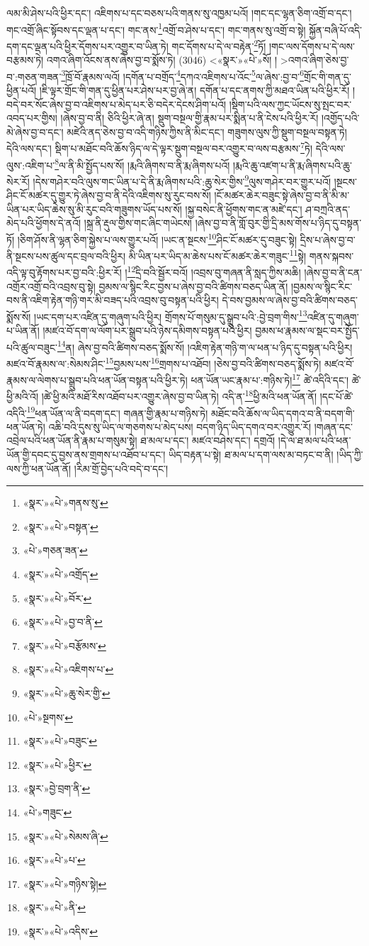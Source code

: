 ལམ་མི་ཤེས་པའི་ཕྱིར་དང་། འཇིགས་པ་དང་བཅས་པའི་གནས་སུ་འཁྱམ་པའོ། །གང་དང་ལྷན་ཅིག་འགྲོ་བ་དང་། གང་འགྲོ་ཞིང་སྟོབས་དང་ལྡན་པ་དང་། གང་ནས་\footnote{«སྣར་»«པེ་»གནས་སུ་}འགྲོ་བ་ཤེས་པ་དང་། གང་གནས་སུ་འགྲོ་བ་སྟེ། སྐྱོན་བཞི་པོ་འདི་དག་དང་ལྡན་པའི་ཕྱིར་དོགས་པར་འགྱུར་བ་ཡིན་ཏེ། གང་དོགས་པ་དེ་ལ་བརྟེན་\footnote{«སྣར་»«པེ་»བསྟན་}ཏོ། །གང་ལས་དོགས་པ་དེ་ལས་བརྩམས་ཏེ། འགའ་ཞིག་འོངས་ནས་ཞེས་བྱ་བ་སྨོས་ཏེ། (3046) <«སྣར་»«པེ་»སོ། །
 >འགའ་ཞིག་ཅེས་བྱ་བ་:གཅན་གཟན་\footnote{«པེ་»གཅན་ཟན་}ཁྲོ་བོ་རྣམས་ལའོ། །དགོན་པ་བགྲོད་\footnote{«སྣར་»«པེ་»འགྲོད་}དཀའ་འཇིགས་པ་འོང་\footnote{«སྣར་»«པེ་»བོར་}ལ་ཞེས་:བྱ་བ་\footnote{«སྣར་»«པེ་»བྱ་བ་ནི་}གྲོང་གི་གན་དུ་ཕྱིན་པའོ། །ཇི་ལྟར་གྲོང་གི་གན་དུ་ཕྱིན་པར་ཤེས་པར་བྱ་ཞེ་ན། དགོན་པ་དང་ནགས་ཀྱི་མཐའ་ཡིན་པའི་ཕྱིར་རོ། །བདེ་བར་སོང་ཞེས་བྱ་བ་འཇིགས་པ་མེད་པར་ཅི་བདེར་དེངས་ཤིག་པའོ། །སྡིག་པའི་ལས་ཀྱང་ཡོངས་སུ་སྤང་བར་འབད་པར་གྱིས། །ཞེས་བྱ་བ་ནི། ཅིའི་ཕྱིར་ཞེ་ན། སྡུག་བསྔལ་གྱི་རྣམ་པར་སྨིན་པ་ནི་ངེས་པའི་ཕྱིར་རོ། །འགྱོད་པའི་མེ་ཞེས་བྱ་བ་དང་། མཛེའི་ནད་ཅེས་བྱ་བ་འདི་གཉིས་ཀྱིས་ནི་མིང་དང་། གཟུགས་ལུས་ཀྱི་སྡུག་བསྔལ་བསྟན་ཏེ། དེའི་ལས་དང་། སྡིག་པ་མཐོང་བའི་ཆོས་ཉིད་ལ་དེ་ལྟར་སྡུག་བསྔལ་བར་འགྱུར་བ་ལས་བརྩམས་\footnote{«སྣར་»«པེ་»བརྩོམས་}ཏེ། དེའི་ལས་ལུས་:འཇིག་པ་\footnote{«སྣར་»«པེ་»འཇིགས་པ་}ལ་ནི་མི་སྤྱོད་པས་སོ། །རྨའི་ཞིགས་བ་ནི་རྨ་ཞིགས་པའོ། །རྨའི་ཆུ་འཛག་པ་ནི་རྨ་ཞིགས་པའི་ཆུ་སེར་རོ། །དེས་གཤེར་བའི་ལུས་གང་ཡིན་པ་དེ་ནི་རྨ་ཞིགས་པའི་:ཆུ་སེར་གྱིས་\footnote{«སྣར་»«པེ་»ཆུ་སེར་གྱི་}ལུས་གཤེར་བར་གྱུར་པའོ། །སྔངས་ཤིང་ངོ་མཚར་དུ་གྱུར་ཏེ་ཞེས་བྱ་བ་ནི་དེའི་འཇིགས་སུ་རུང་བས་སོ། །ངོ་མཚར་ཆེར་བཟུང་སྟེ་ཞེས་བྱ་བ་ནི་མི་མ་ཡིན་པར་ཡིད་ཆེས་སུ་མི་རུང་བའི་གཟུགས་ཡོད་པས་སོ། །སྐྱ་བསེང་ནི་ཕྱོགས་གང་ན་མཛེ་དང་། ཤ་བཀྲའི་ནད་མེད་པའི་ཕྱོགས་དེ་ནའོ། །སྐྲ་ནི་རྡུལ་གྱིས་གང་ཞིང་གཡེངས། །ཞེས་བྱ་བ་ནི་གློ་བུར་གྱི་དྲི་མས་གོས་པ་ཉིད་དུ་བསྟན་ཏོ། །ཅིག་ཤོས་ནི་ལྷན་ཅིག་སྐྱེས་པ་ལས་གྱུར་པའོ། །ཡང་ན་སྔངས་\footnote{«པེ་»སྔགས་}ཤིང་ངོ་མཚར་དུ་བཟུང་སྟེ། དྲིས་པ་ཞེས་བྱ་བ་ནི་སྔངས་པས་ཚུལ་དང་བྲལ་བའི་ཕྱིར། མི་ཡིན་པར་ཡིད་མ་ཆེས་པས་ངོ་མཚར་ཆེར་གཟུང་\footnote{«སྣར་»«པེ་»བཟུང་}སྟེ། གནས་སྐབས་འདི་ལྟ་བུ་རྟོགས་པར་བྱ་བའི་:ཕྱིར་རོ། །\footnote{«སྣར་»«པེ་»ཕྱིར་}དྲི་བའི་སྦྱོར་བའོ། །འབྲས་བུ་གཞན་ནི་སླད་ཀྱིས་མཆི། །ཞེས་བྱ་བ་ནི་ངན་འགྲོར་འགྲོ་བའི་འབྲས་བུ་སྟེ། བྱམས་ལ་སྙིང་རིང་བྱས་པ་ཞེས་བྱ་བའི་ཚིགས་བཅད་ཡིན་ནོ། །བྱམས་ལ་སྙིང་རིང་བས་ནི་འཇིག་རྟེན་གཉི་གར་མི་བཟད་པའི་འབྲས་བུ་བསྟན་པའི་ཕྱིར། དེ་བས་བྱམས་ལ་ཞེས་བྱ་བའི་ཚིགས་བཅད་སྨོས་སོ། །ཡང་དག་པར་འཛིན་དུ་གཞུག་པའི་ཕྱིར། གྲོགས་པོ་གསུམ་དུ་སྒྲུབ་པའི་:བྱེ་བྲག་གིས་\footnote{«སྣར་»བྱེ་བྲག་ནི་}འཛིན་དུ་གཞུག་པ་ཡིན་ནོ། །མཛའ་བོ་དག་ལ་ལོག་པར་སྒྲུབ་པའི་ཉེས་དམིགས་བསྟན་པའི་ཕྱིར། བྱམས་ཕ་རྣམས་ལ་སྡང་བར་སྤྱོད་པའི་ཚུལ་བཟུང་\footnote{«པེ་»གཟུང་}ན། ཞེས་བྱ་བའི་ཚིགས་བཅད་སྨོས་སོ། །འཇིག་རྟེན་གཉི་ག་ལ་ཕན་པ་ཉིད་དུ་བསྟན་པའི་ཕྱིར། མཛའ་བོ་རྣམས་ལ་:སེམས་ཤིང་\footnote{«སྣར་»«པེ་»སེམས་ཞི་}བྱམས་པས་\footnote{«སྣར་»«པེ་»པ་}གྲགས་པ་འཐོབ། །ཅེས་བྱ་བའི་ཚིགས་བཅད་སྨོས་ཏེ། མཛའ་བོ་རྣམས་ལ་ལེགས་པ་སྒྲུབ་པའི་ཕན་ཡོན་བསྟན་པའི་ཕྱིར་ཏེ། ཕན་ཡོན་ཡང་རྣམ་པ་:གཉིས་ཏེ།\footnote{«སྣར་»«པེ་»གཉིས་སྟེ།} ཚེ་འདིའི་དང་། ཚེ་ཕྱི་མའི་འོ། །ཚེ་ཕྱི་མའི་མཐོ་རིས་འཐོབ་པར་འགྱུར་ཞེས་བྱ་བ་ཡིན་ཏེ། འདི་ན་\footnote{«སྣར་»«པེ་»ནི་}ཕྱི་མའི་ཕན་ཡོན་ནོ། །དང་པོ་ཚེ་འདིའི་\footnote{«སྣར་»«པེ་»འདིས་}ཕན་ཡོན་ལ་ནི་བདག་དང་། གཞན་གྱི་རྣམ་པ་གཉིས་ཏེ། མཐོང་བའི་ཆོས་ལ་ཡིད་དགའ་བ་ནི་བདག་གི་ཕན་ཡོན་ཏེ། འཆི་བའི་དུས་སུ་ཡིད་ལ་གཅགས་པ་མེད་པས། བདག་ཉིད་ཡིད་དགའ་བར་འགྱུར་རོ། །གཞན་དང་འབྲེལ་པའི་ཕན་ཡོན་ནི་རྣམ་པ་གསུམ་སྟེ། ཐ་མལ་པ་དང་། མཛའ་བཤེས་དང་། དགྲའོ། །དེ་ལ་ཐ་མལ་པའི་ཕན་ཡོན་གྱི་དབང་དུ་བྱས་ནས་གྲགས་པ་འཐོབ་པ་དང་། ཡིད་བརྟན་པ་སྟེ། ཐ་མལ་པ་དག་ལས་མ་བཏང་བ་ནི། །ཡིད་ཀྱི་ལས་ཀྱི་ཕན་ཡོན་ནོ། །རིམ་གྲོ་བྱེད་པའི་བདེ་བ་དང་། 